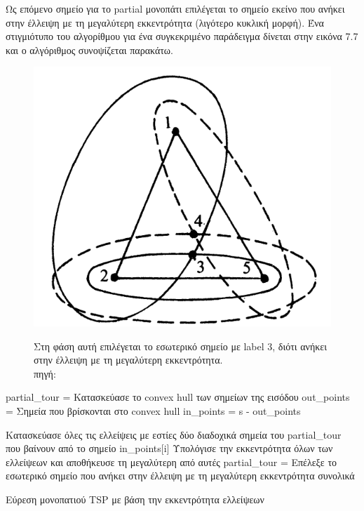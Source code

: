 \documentclass[oneside,12pt]{book}
\newenvironment{matlab}
	{\begin{figure}[hp]\centering\captionsetup{justification=centering}}
	{\end{figure}}
\theoremstyle{definition}
\begin{document}
 Ως επόμενο σημείο για το partial μονοπάτι επιλέγεται το σημείο εκείνο που ανήκει στην έλλειψη με τη μεγαλύτερη εκκεντρότητα (λιγότερο κυκλική μορφή). Ένα στιγμιότυπο του αλγορίθμου για ένα συγκεκριμένο παράδειγμα δίνεται στην εικόνα 7.7 και ο αλγόριθμος συνοψίζεται παρακάτω. \\
 
\begin{matlab}
  	\includegraphics[scale=0.3]{images/geometric_approach_ellipse2.png}
	\caption{Στη φάση αυτή επιλέγεται το εσωτερικό σημείο με label 3, διότι ανήκει στην έλλειψη με τη μεγαλύτερη εκκεντρότητα.\\ πηγή: \cite{16}}
\end{matlab}  

\begin{algorithm}[H]
	\SetAlgoLined
	
	partial\_tour = Κατασκεύασε το convex hull των σημείων της εισόδου \;
	out\_points = Σημεία που βρίσκονται στο convex hull \;
	in\_points = s - out\_points \;
	
	{
		{
			Κατασκεύασε όλες τις ελλείψεις με εστίες δύο διαδοχικά σημεία του partial\_tour που βαίνουν από το σημείο in\_points[i] \; 
			Υπολόγισε την εκκεντρότητα όλων των ελλείψεων και αποθήκευσε τη μεγαλύτερη από αυτές \;
		}
		partial\_tour = Επέλεξε το εσωτερικό σημείο που ανήκει στην έλλειψη με τη μεγαλύτερη εκκεντρότητα συνολικά \;
	}
	
	\caption{Εύρεση μονοπατιού TSP με βάση την εκκεντρότητα ελλείψεων}
\end{algorithm}
\end{document}
